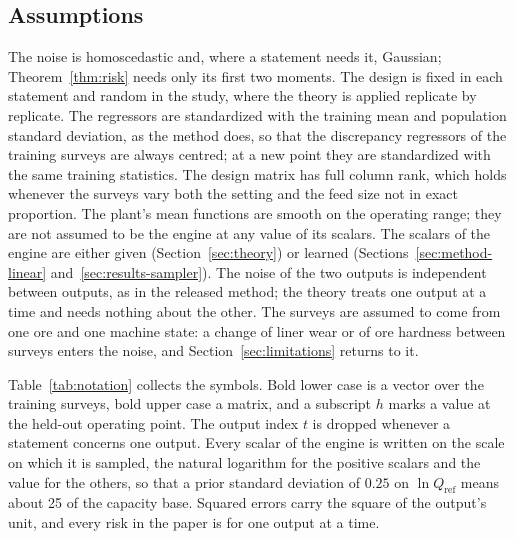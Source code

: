 \subsection{Assumptions}

The noise is homoscedastic and, where a statement needs it, Gaussian; Theorem~\ref{thm:risk} needs only its first two
moments. The design is fixed in each statement and random in the study, where the theory is applied replicate by replicate.
The regressors are standardized with the training mean and population standard deviation, as the method does, so that the
discrepancy regressors of the training surveys are always centred; at a new point they are standardized with the same
training statistics. The design matrix has full column rank, which holds whenever the surveys vary both the setting and the
feed size not in exact proportion. The plant's mean functions are smooth on the operating range; they are not assumed to be the
engine at any value of its scalars. The scalars of the engine are either given (Section~\ref{sec:theory}) or learned
(Sections~\ref{sec:method-linear} and~\ref{sec:results-sampler}). The noise of the two outputs is independent between outputs,
as in the released method; the theory treats one output at a time and needs nothing about the other. The surveys are assumed to
come from one ore and one machine state: a change of liner wear or of ore hardness between surveys enters the noise, and
Section~\ref{sec:limitations} returns to it.

Table~\ref{tab:notation} collects the symbols. Bold lower case is a vector over the training surveys, bold upper case a
matrix, and a subscript $h$ marks a value at the held-out operating point. The output index $t$ is dropped whenever a
statement concerns one output. Every scalar of the engine is written on the scale on which it is sampled, the natural logarithm
for the positive scalars and the value for the others, so that a prior standard deviation of $0.25$ on $\ln Q_{\mathrm{ref}}$ means
about 25\pct{} of the capacity base. Squared errors carry the square of the output's unit, and every risk in the paper is for
one output at a time.

